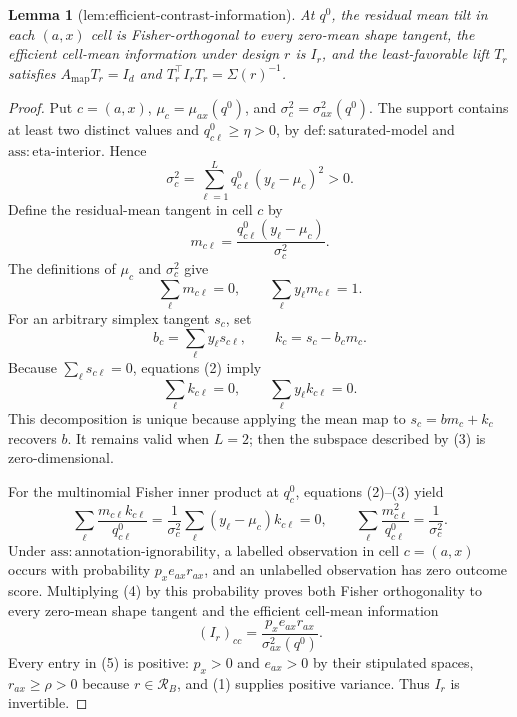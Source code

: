 \documentclass{article}
\newtheorem{lemma}{Lemma}
\begin{document}
\begin{lemma}[lem:efficient-contrast-information]\label{lem:efficient-contrast-information}
At \(q^0\), the residual mean tilt in each \((a,x)\) cell is Fisher-orthogonal to every zero-mean shape tangent, the efficient cell-mean information under design \(r\) is \(I_r\), and the least-favorable lift \(T_r\) satisfies \(A_{\mathrm{map}}T_r=I_d\) and \(T_r^\top I_rT_r=\Sigma(r)^{-1}\).
\end{lemma}
\begin{proof}
Put \(c=(a,x)\), \(\mu_c=\mu_{ax}(q^0)\), and \(\sigma_c^2=\sigma^2_{ax}(q^0)\).  The support contains at least two distinct values and \(q^0_{c\ell}\geq\eta>0\), by \(\mathrm{def:saturated\text{-}model}\) and \(\mathrm{ass:eta\text{-}interior}\).  Hence
\[
 \sigma_c^2=\sum_{\ell=1}^Lq^0_{c\ell}(y_\ell-\mu_c)^2>0.
 \tag{1}
\]
Define the residual-mean tangent in cell \(c\) by
\[
 m_{c\ell}=\frac{q^0_{c\ell}(y_\ell-\mu_c)}{\sigma_c^2}.
\]
The definitions of \(\mu_c\) and \(\sigma_c^2\) give
\[
 \sum_\ell m_{c\ell}=0,\qquad
 \sum_\ell y_\ell m_{c\ell}=1.                                      \tag{2}
\]
For an arbitrary simplex tangent \(s_c\), set
\[
 b_c=\sum_\ell y_\ell s_{c\ell},\qquad k_c=s_c-b_cm_c.
\]
Because \(\sum_\ell s_{c\ell}=0\), equations (2) imply
\[
 \sum_\ell k_{c\ell}=0,\qquad \sum_\ell y_\ell k_{c\ell}=0.          \tag{3}
\]
This decomposition is unique because applying the mean map to \(s_c=bm_c+k_c\) recovers \(b\).  It remains valid when \(L=2\); then the subspace described by (3) is zero-dimensional.

For the multinomial Fisher inner product at \(q^0_c\), equations (2)--(3) yield
\[
 \sum_\ell\frac{m_{c\ell}k_{c\ell}}{q^0_{c\ell}}
 =\frac1{\sigma_c^2}\sum_\ell(y_\ell-\mu_c)k_{c\ell}=0,\qquad
 \sum_\ell\frac{m_{c\ell}^2}{q^0_{c\ell}}=\frac1{\sigma_c^2}.       \tag{4}
\]
Under \(\mathrm{ass:annotation\text{-}ignorability}\), a labelled observation in cell \(c=(a,x)\) occurs with probability \(p_xe_{ax}r_{ax}\), and an unlabelled observation has zero outcome score.  Multiplying (4) by this probability proves both Fisher orthogonality to every zero-mean shape tangent and the efficient cell-mean information
\[
 (I_r)_{cc}=\frac{p_xe_{ax}r_{ax}}{\sigma^2_{ax}(q^0)}.                \tag{5}
\]
Every entry in (5) is positive: \(p_x>0\) and \(e_{ax}>0\) by their stipulated spaces, \(r_{ax}\geq\rho>0\) because \(r\in\mathcal R_B\), and (1) supplies positive variance.  Thus \(I_r\) is invertible.


\end{proof}
\end{document}
